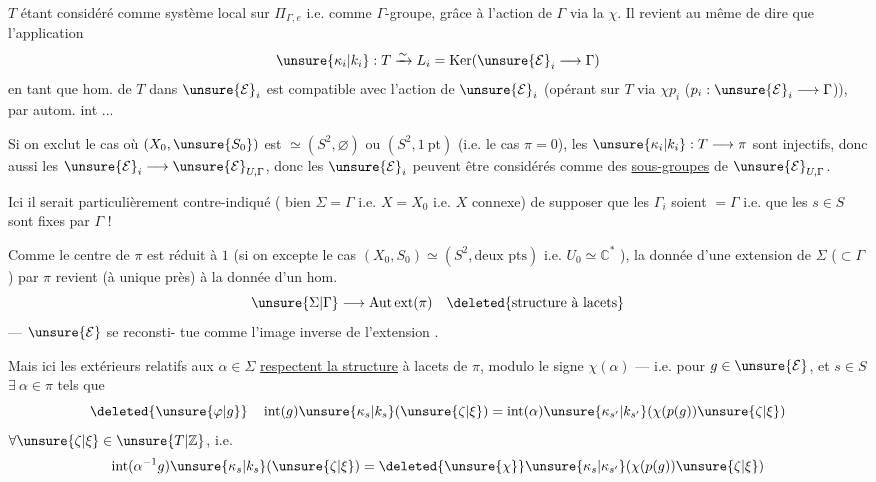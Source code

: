 $T$ étant considéré comme système local
sur $\Pi_{\Gamma,e}$  i.e. comme $\Gamma$-groupe, grâce à l'action
de $\Gamma$ via la  $\chi$. Il revient au
même de dire que  l'application
\[
\unsure{\kappa_i|k_i}:T\xrightarrow{\sim}L_i=\operatorname{Ker}(\unsure{\mathcal E}_i\longrightarrow\Gamma)
\]
en tant que hom. de $T$ dans $\unsure{\mathcal E}_i$ est
compatible avec l'action de $\unsure{\mathcal E}_i$ (opérant
sur $T$ via $\chi p_i$ ($p_i:\unsure{\mathcal E}_i\longrightarrow\Gamma$)), 
 par autom. int ...

Si on exclut le cas où $(X_0,\unsure{S_0})$
est $\simeq(S^2,\varnothing)$ ou $(S^2,1\ \mathrm{pt})$ (i.e.
le cas $\pi=0$), les $\unsure{\kappa_i|k_i}:T\longrightarrow\pi$ sont injectifs,
donc aussi les $\unsure{\mathcal E}_i\longrightarrow\unsure{\mathcal E}_{U,\Gamma}$, donc les
$\unsure{\mathcal E}_i$ peuvent être considérés comme des
\uline{sous-groupes} de $\unsure{\mathcal E}_{U,\Gamma}$.

\unsure{\S} Ici il  serait particulièrement
contre-indiqué ( bien  $\Sigma=\Gamma$ i.e.
$X=X_0$ i.e. $X$ connexe) de supposer que
les $\Gamma_i$ soient $=\Gamma$ i.e. que les $s\in S$ sont fixes
par $\Gamma$ !

Comme le centre de $\pi$ est réduit à $1$
(si on excepte  le cas $(X_0,S_0)\simeq(S^2,\text{deux pts})$
i.e. $U_0\simeq\mathbb C^*$ ), la donnée d'une extension
de $\Sigma$ ($\subset\Gamma$) par $\pi$ revient (à  unique
près) à la donnée d'un hom.
\[
\unsure{\Sigma|\Gamma}\longrightarrow\mathrm{Aut\,ext}(\pi)\quad\deleted{\text{structure à lacets}}
\]
 --- $\unsure{\mathcal E}$ se reconsti-
tue comme l'image inverse de l'extension
.

Mais ici les  extérieurs relatifs
aux $\alpha\in\Sigma$  \uline{respectent la structure}
à lacets  de $\pi$, modulo le
signe $\chi(\alpha)$ --- i.e. pour $g\in\unsure{\mathcal E}$, et $s\in S$
$\exists\ \alpha\in\pi$  tels que
\[
\deleted{\unsure{\varphi|g}}\quad
\operatorname{int}(g)\unsure{\kappa_s|k_s}(\unsure{\zeta|\xi})
=\operatorname{int}(\alpha)\unsure{\kappa_{s'}|k_{s'}}(\chi(p(g))\unsure{\zeta|\xi})
\]
$\forall\unsure{\zeta|\xi}\in\unsure{T|\mathbb Z}$, i.e.
\[
\operatorname{int}(\alpha^{-1}g)\unsure{\kappa_s|k_s}(\unsure{\zeta|\xi})
=\deleted{\unsure{\chi}}\unsure{\kappa_s|\kappa_{s'}}(\chi(p(g))\unsure{\zeta|\xi})
\]

